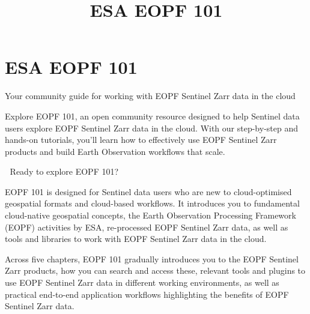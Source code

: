 \documentclass[
  letterpaper,
  DIV=11,
  numbers=noendperiod]{scrreprt}
\title{\textbf{ESA EOPF 101}}
\author{}
\date{}
\renewcommand*\contentsname{Table of contents}
\newcommand\contentsname{Table of contents}
\begin{document}
\maketitle

\renewcommand*\contentsname{Table of contents}
{
\hypersetup{linkcolor=}
\setcounter{tocdepth}{2}
\tableofcontents
}


\chapter{\texorpdfstring{\textbf{ESA EOPF
101}}{ESA EOPF 101}}\label{esa-eopf-101}

Your community guide for working with EOPF Sentinel Zarr data in the
cloud

Explore EOPF 101, an open community resource designed to help Sentinel
data users explore EOPF Sentinel Zarr data in the cloud. With our
step-by-step and hands-on tutorials, you'll learn how to effectively use
EOPF Sentinel Zarr products and build Earth Observation workflows that
scale.

🚀 Ready to explore EOPF 101?

EOPF 101 is designed for Sentinel data users who are new to
cloud-optimised geospatial formats and cloud-based workflows. It
introduces you to fundamental cloud-native geospatial concepts, the
Earth Observation Processing Framework (EOPF) activities by ESA,
re-processed EOPF Sentinel Zarr data, as well as tools and libraries to
work with EOPF Sentinel Zarr data in the cloud.

Across five chapters, EOPF 101 gradually introduces you to the EOPF
Sentinel Zarr products, how you can search and access these, relevant
tools and plugins to use EOPF Sentinel Zarr data in different working
environments, as well as practical end-to-end application workflows
highlighting the benefits of EOPF Sentinel Zarr data.
\end{document}
